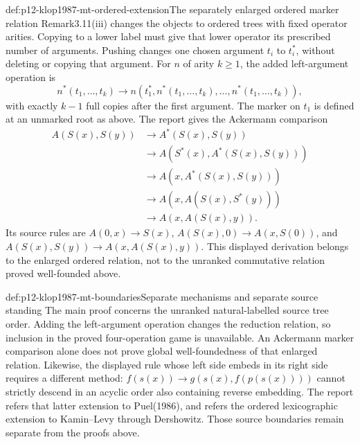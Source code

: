 \begin{hbdefinition}{def:p12-klop1987-mt-ordered-extension}{The separately enlarged ordered marker relation}
Remark3.11(iii) changes the objects to ordered trees with fixed
operator arities. Copying to a lower label must give that lower
operator its prescribed number of arguments. Pushing changes one
chosen argument \(t_i\) to \(t_i^*\), without deleting or copying
that argument. For \(n\) of arity \(k\geq1\), the added
left-argument operation is
\[
 n^*(t_1,\ldots,t_k)\longrightarrow
 n(t_1^*,n^*(t_1,\ldots,t_k),\ldots,n^*(t_1,\ldots,t_k)),
\]
with exactly \(k-1\) full copies after the first argument.
The marker on \(t_1\) is defined at an unmarked root as above.
The report gives the Ackermann comparison
\begin{align*}
 A(S(x),S(y))&\longrightarrow A^*(S(x),S(y))\\
 &\longrightarrow A(S^*(x),A^*(S(x),S(y)))\\
 &\longrightarrow A(x,A^*(S(x),S(y)))\\
 &\longrightarrow A(x,A(S(x),S^*(y)))\\
 &\longrightarrow A(x,A(S(x),y)).
\end{align*}
Its source rules are \(A(0,x)\to S(x)\),
\(A(S(x),0)\to A(x,S(0))\), and
\(A(S(x),S(y))\to A(x,A(S(x),y))\).
This displayed derivation belongs to the enlarged ordered relation,
not to the unranked commutative relation proved well-founded above.
\end{hbdefinition}

\begin{proofboundary}{def:p12-klop1987-mt-boundaries}{Separate mechanisms and separate source standing}
The main proof concerns the unranked natural-labelled source tree
order. Adding the left-argument operation changes the reduction
relation, so inclusion in the proved four-operation game is unavailable.
An Ackermann marker comparison alone does not prove global
well-foundedness of that enlarged relation. Likewise, the displayed
rule whose left side embeds in its right side requires a different
method: \(f(s(x))\to g(s(x),f(p(s(x))))\) cannot strictly descend
in an acyclic order also containing reverse embedding.
The report refers that latter extension to Puel(1986), and refers
the ordered lexicographic extension to Kamin--Levy through Dershowitz.
Those source boundaries remain separate from the proofs above.
\end{proofboundary}
